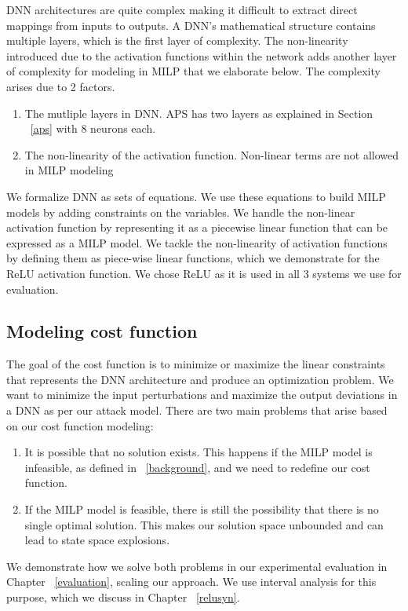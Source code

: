 DNN architectures are quite complex making it difficult to extract direct mappings from inputs to outputs. 
A \ac{DNN}'s  mathematical structure contains multiple layers, which is the first layer of complexity. The non-linearity introduced due to the activation functions within the network adds another layer of complexity for modeling in \ac{MILP}  that we elaborate below. 
The complexity arises due to 2 factors.
\begin{enumerate}
	\item The mutliple layers in \ac{DNN}.
	\ac{APS} has two layers as explained in Section ~\ref{aps} with $8$ neurons each. 
	\item The non-linearity  of the activation function. 
	Non-linear terms are not allowed in \ac{MILP} modeling \cite{gnonlinearity}
\end{enumerate}

We formalize \ac{DNN} as sets of equations.
We use these equations to build \ac{MILP} models by adding constraints on the variables. 
We handle the non-linear activation function by representing it as a piecewise linear function that can be expressed as a \ac{MILP} model. 
We tackle the non-linearity of activation functions by defining them as piece-wise linear functions, which we demonstrate for the ReLU activation function.
We chose ReLU as it is used in all 3 systems we use for evaluation. 

\subsection{Modeling cost function}
The goal of the cost function is to minimize or maximize the linear constraints that represents the \ac{DNN} architecture and produce an optimization problem. 
We want to minimize the input perturbations and maximize the output deviations in a \ac{DNN} as per our attack model. 
There are two main problems that arise based on our cost function modeling:
\begin{enumerate}
	\item It is possible that no solution exists. 
	This happens if the \ac{MILP} model is infeasible, as defined in ~\ref{background}, and we need to redefine our cost function. 
	\item If the \ac{MILP} model is feasible, there is still the possibility that there is no single optimal solution. 
	This makes our solution space unbounded and can lead to state space explosions. 
\end{enumerate}

We demonstrate how we solve both problems in our experimental evaluation in Chapter ~\ref{evaluation}, scaling our approach. 
We use interval analysis for this purpose, which we discuss in Chapter ~\ref{relusyn}. 


















